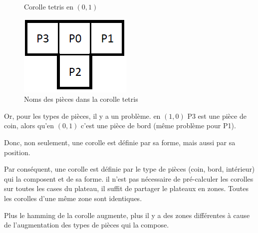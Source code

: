 \begin{exmp}
\begin{figure}[H]
\begin{minipage}{0.33\textwidth}
\begin{center}
					\caption{Corolle tetris en $(0,1)$}\label{fig:corolle_tetris_2}
				\end{center}
			\end{minipage}\hfill
			\begin{minipage}{0.33\textwidth}
				\includegraphics{images/corolle_tetris.png}
				\caption{Noms des pièces dans la corolle tetris}\label{fig:corolle_tetris}
			\end{minipage}\hfill
		\end{figure}
		
		Or, pour les types de pièces, il y a un problème. en $(1,0)$ P3 est une pièce de coin, alors qu'en $(0,1)$ c'est une pièce de bord (même problème pour P1).
		
		Donc, non seulement, une corolle est définie par sa forme, mais aussi par sa position.
	\end{exmp}
	
	Par conséquent, une corolle est définie par le type de pièces (coin, bord, intérieur) qui la composent et de sa forme. il n'est pas nécessaire de pré-calculer les corolles sur toutes les cases du plateau, il suffit de partager le plateaux en zones. Toutes les corolles d'une même zone sont identiques.
	
	\begin{rem}
		Plus le hamming de la corolle augmente, plus il y a des zones différentes à cause de l'augmentation des types de pièces qui la compose.
	\end{rem}
	
